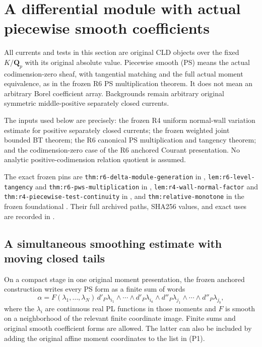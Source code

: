 \section{A differential module with actual piecewise smooth coefficients}
\label{sec:r10-pws-differential-module}

All currents and tests in this section are original CLD objects over
the fixed $K/\mathbf Q_p$ with its original absolute value.  Piecewise
smooth (PS) means the actual codimension-zero sheaf, with tangential
matching and the full actual moment equivalence, as in the frozen R6
PS multiplication theorem.  It does not mean an arbitrary Borel
coefficient array.  Backgrounds remain arbitrary original symmetric
middle-positive separately closed currents.

The inputs used below are precisely: the frozen R4 uniform normal-wall
variation estimate for positive separately closed currents; the frozen
weighted joint bounded BT theorem; the R6 canonical PS multiplication
and tangency theorem; and the codimension-zero case of the R6 anchored
Courant presentation.  No analytic positive-codimension relation
quotient is assumed.

The exact frozen pins are
\texttt{thm:r6-delta-module-generation} in
\texttt{},
\texttt{lem:r6-level-tangency} and
\texttt{thm:r6-pws-multiplication} in
\texttt{},
\texttt{lem:r4-wall-normal-factor} and
\texttt{thm:r4-piecewise-test-continuity} in
\texttt{}, and
\texttt{thm:relative-monotone} in the frozen foundational
\texttt{}.
Their full archived paths, SHA256 values, and exact uses are
recorded in \texttt{}.

\subsection{A simultaneous smoothing estimate with moving closed tails}

On a compact stage in one original moment presentation, the frozen
anchored construction writes every PS form as a finite sum of words
\[
 \alpha=
 F(\lambda_1,\ldots,\lambda_N)\,
 d'_P\lambda_{i_1}\wedge\cdots\wedge d'_P\lambda_{i_a}
 \wedge d''_P\lambda_{j_1}\wedge\cdots\wedge d''_P\lambda_{j_b},
 \tag{P1}
\]
where the $\lambda_i$ are continuous real PL functions in those
moments and $F$ is smooth on a neighborhood of the relevant finite
coordinate image.  Finite sums and original smooth coefficient forms
are allowed.  The latter can also be included by adding the original
affine moment coordinates to the list in (P1).

